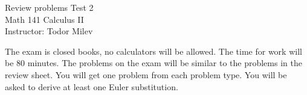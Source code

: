 \documentclass{article}
\begin{document}
\begin{center}
\Large
Review problems Test 2\\ Math 141 Calculus II \\ \normalsize Instructor: Todor Milev
\end{center}


\noindent The exam is closed books, no calculators will be allowed. The time for work will be 80 minutes. The problems on the exam will be similar to the problems in the review sheet. You will get one problem from each problem type. You will be asked to derive at least one Euler substitution.
\end{document}
